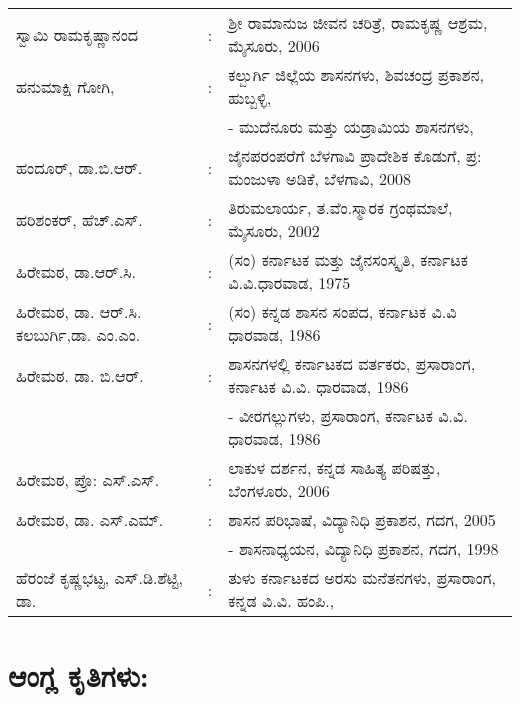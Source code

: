 \begin{longtable}[l]{@{}>{\raggedright}p{4.7cm}cp{9.2cm}<{\raggedright}@{}}
ಸ್ವಾಮಿ ರಾಮಕೃಷ್ಣಾನಂದ & : &  ಶ‍್ರೀ ರಾಮಾನುಜ ಜೀವನ ಚರಿತ್ರೆ, ರಾಮಕೃಷ್ಣ ಆಶ್ರಮ, ಮೈಸೂರು, 2006\\
ಹನುಮಾಕ್ಷಿ ಗೋಗಿ, & : & ಕಲ್ಬುರ್ಗಿ ಜಿಲ್ಲೆಯ ಶಾಸನಗಳು, ಶಿವಚಂದ್ರ ಪ್ರಕಾಶನ, ಹುಬ್ಬಳ್ಳಿ,\\
&& - ಮುದೆನೂರು ಮತ್ತು ಯಡ್ರಾಮಿಯ ಶಾಸನಗಳು,\\
ಹಂದೂರ್​, ಡಾ.ಬಿ.ಆರ್​. & : & ಜೈನಪರಂಪರೆಗೆ ಬೆಳಗಾವಿ ಪ್ರಾದೇಶಿಕ ಕೊಡುಗೆ, ಪ್ರ: ಮಂಜುಳಾ ಅಡಿಕೆ, ಬೆಳಗಾವಿ, 2008\\
ಹರಿಶಂಕರ್​, ಹೆಚ್​.ಎಸ್​. & : & ತಿರುಮಲಾರ್ಯ, ತ.ವೆಂ.ಸ್ಮಾರಕ ಗ್ರಂಥಮಾಲೆ, ಮೈಸೂರು, 2002\\
ಹಿರೇಮಠ, ಡಾ.ಆರ್​.ಸಿ. & : & (ಸಂ) ಕರ್ನಾಟಕ ಮತ್ತು ಜೈನಸಂಸ್ಕೃತಿ, ಕರ್ನಾಟಕ ವಿ.ವಿ.ಧಾರವಾಡ, 1975\\
ಹಿರೇಮಠ, ಡಾ. ಆರ್​.ಸಿ. ಕಲಬುರ್ಗಿ,ಡಾ. ಎಂ.ಎಂ. & : &  (ಸಂ) ಕನ್ನಡ ಶಾಸನ ಸಂಪದ, ಕರ್ನಾಟಕ ವಿ.ವಿ ಧಾರವಾಡ, 1986\\
ಹಿರೇಮಠ. ಡಾ. ಬಿ.ಆರ್​. & : &  ಶಾಸನಗಳಲ್ಲಿ ಕರ್ನಾಟಕದ ವರ್ತಕರು, ಪ್ರಸಾರಾಂಗ, ಕರ್ನಾಟಕ ವಿ.ವಿ. ಧಾರವಾಡ, 1986\\
&& - ವೀರಗಲ್ಲುಗಳು, ಪ್ರಸಾರಾಂಗ, ಕರ್ನಾಟಕ ವಿ.ವಿ. ಧಾರವಾಡ, 1986\\
ಹಿರೇಮಠ, ಪ್ರೊ: ಎಸ್​.ಎಸ್​. & : &  ಲಾಕುಳ ದರ್ಶನ, ಕನ್ನಡ ಸಾಹಿತ್ಯ ಪರಿಷತ್ತು, ಬೆಂಗಳೂರು, 2006\\
ಹಿರೇಮಠ, ಡಾ. ಎಸ್​.ಎಮ್. & : & ಶಾಸನ ಪರಿಭಾಷೆ, ವಿದ್ಯಾನಿಧಿ ಪ್ರಕಾಶನ, ಗದಗ, 2005\\
&& - ಶಾಸನಾಧ್ಯಯನ, ವಿದ್ಯಾನಿಧಿ ಪ್ರಕಾಶನ, ಗದಗ, 1998\\
ಹೆರಂಜೆ ಕೃಷ್ಣಭಟ್ಟ, ಎಸ್​.ಡಿ.ಶೆಟ್ಟಿ, ಡಾ. & : &  ತುಳು ಕರ್ನಾಟಕದ ಅರಸು ಮನೆತನಗಳು, ಪ್ರಸಾರಾಂಗ, ಕನ್ನಡ ವಿ.ವಿ. ಹಂಪಿ.,
\end{longtable}

\section*{ಆಂಗ್ಲ ಕೃತಿಗಳು:}

